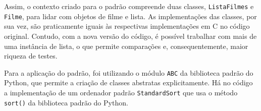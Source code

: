 \documentclass[a4paper]{article}
\begin{document}
	Assim, o contexto criado para o padrão compreende duas classes, \texttt{ListaFilmes} e \texttt{Filme}, para lidar com objetos de filme e lista. As implementações das classes, por sua vez, são praticamente iguais às respectivas implementações em C no código original. Contudo, com a nova versão do código, é possível trabalhar com mais de uma instância de lista, o que permite comparações e, consequentemente, maior riqueza de testes.

	Para a aplicação do padrão, foi utilizando o módulo \texttt{ABC} da biblioteca padrão do Python, que permite a criação de classes abstratas explicitamente. Há no código a implementação de um ordenador padrão \texttt{StandardSort} que usa o método \texttt{sort()} da biblioteca padrão do Python.
\end{document}
